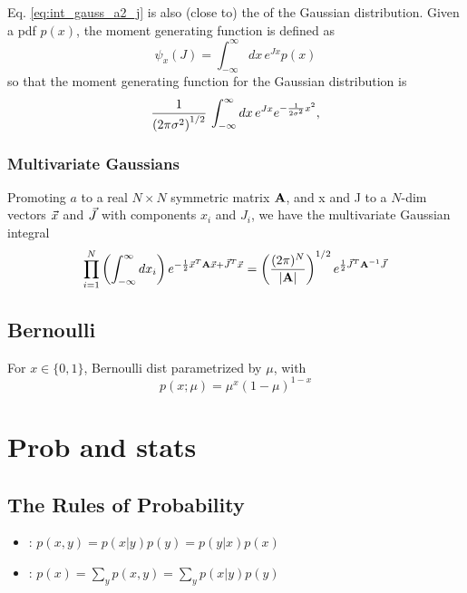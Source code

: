 \documentclass[11pt]{article}
\begin{document}
Eq. \ref{eq:int_gauss_a2_j} is also (close to) the  of
the Gaussian distribution. Given a pdf $p(x)$, the moment generating function is defined
as
\begin{equation}
  \psi_x(J) = \int_{-\infty}^{\infty} dx\, e^{J x} p(x)
\end{equation}
so that the moment generating function for the Gaussian distribution is
\begin{equation}
  \frac{1}{\left( 2 \pi \sigma^2 \right)^{1/2}}\, \int_{-\infty}^{\infty} dx\,
  e^{J x}  e^{-\frac{1}{2 \sigma^2} x^2}, 
\end{equation}

\subsubsection{Multivariate Gaussians}
Promoting $a$ to a real $N \times N$ symmetric matrix $\mathbf{A}$, and x and J to a $N$-dim
vectors $\vec{x}$ and $\vec{J}$ with components $x_i$ and $J_i$, we have the multivariate
Gaussian integral 
\begin{equation}
  \prod_{i=1}^N \left( \int_{-\infty}^{\infty} dx_i \right)
  e^{-\frac{1}{2} \vec{x}^T \mathbf{A} \vec{x} + \vec{J}^T \vec{x}} =
  \left( \frac{(2 \pi)^N}{|\mathbf{A}|} \right)^{1/2} e^{\frac{1}{2} \vec{J}^T \mathbf{A}^{-1} \vec{J}}
\end{equation}
\TODOFIN{}

\subsection{Bernoulli}
For $x \in \{0, 1\}$, Bernoulli dist parametrized by $\mu$, with
\begin{equation}
  p(x; \mu) = \mu^x (1-\mu)^{1-x}
\end{equation}


\section{Prob and stats}
\subsection{The Rules of Probability}
\begin{itemize}
  \item {}: $p(x, y) = p(x|y) p(y) = p(y|x) p(x)$
  \item {}: $p(x) = \sum\limits_y p(x, y) = \sum\limits_y p(x | y) p(y)$
\end{itemize}
\end{document}
